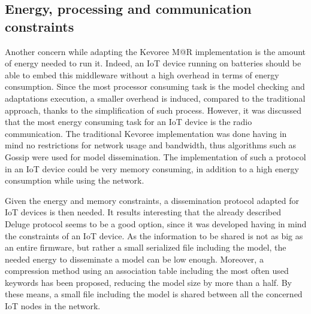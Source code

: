 \subsection{Energy, processing and communication constraints}
Another concern while adapting the Kevoree M@R implementation is the amount of energy needed to run it.
Indeed, an IoT device running on batteries should be able to embed this middleware without a high overhead in terms of energy consumption.
Since the most processor consuming task is the model checking and adaptations execution, a smaller overhead is induced, compared to the traditional approach, thanks to the simplification of such process.
However, it was discussed that the most energy consuming task for an IoT device is the radio communication.
The traditional Kevoree implementation was done having in mind no restrictions for network usage and bandwidth, thus algorithms such as Gossip\cite{fouquet2012dissemination} were used for model dissemination.
The implementation of such a protocol in an IoT device could be very memory consuming, in addition to a high energy consumption while using the network.

Given the energy and memory constraints, a dissemination protocol adapted for IoT devices is then needed.
It results interesting that the already described Deluge protocol\cite{hui2004dynamic} seems to be a good option, since it was developed having in mind the constraints of an IoT device.
As the information to be shared is not as big as an entire firmware, but rather a small serialized file including the model, the needed energy to disseminate a model can be low enough.
Moreover, a compression method using an association table including the most often used keywords has been proposed, reducing the model size by more than a half.
By these means, a small file including the model is shared between all the concerned IoT nodes in the network.


